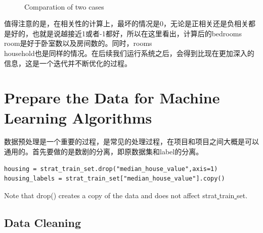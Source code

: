 \documentclass[UTF8]{ctexart}
\begin{document}
\begin{figure}[H]
  \centering
     \  
    \caption{Comparation of two cases}
    \label{fig:data_distribution}
    \vspace{0.2in}
\end{figure}

值得注意的是，在相关性的计算上，最坏的情况是0，无论是正相关还是负相关都是好的，也就是说越接近1或者-1都好，所以在这里看出，计算后的bedrooms\underline{ }room是好于卧室数以及房间数的。同时，rooms\underline{ }\\household也是同样的情况。在后续我们运行系统之后，会得到比现在更加深入的信息，这是一个迭代并不断优化的过程。

\section{Prepare the Data for Machine Learning Algorithms}

数据预处理是一个重要的过程，是常见的处理过程，在项目和项目之间大概是可以通用的。首先要做的是数剧的分离，即原数据集和label的分离。
\begin{lstlisting}
housing = strat_train_set.drop("median_house_value",axis=1)
housing_labels = strat_train_set["median_house_value"].copy()
\end{lstlisting}
Note that drop() creates a copy of the data and does not affect  strat\underline{ }train\underline{ }set.

\subsection{Data Cleaning}
\end{document}
